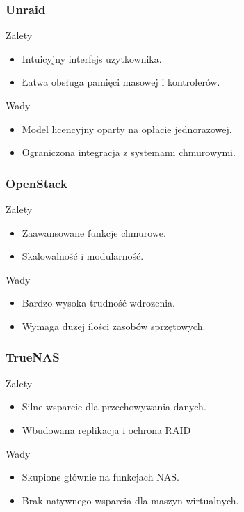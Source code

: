 \subsubsection{Unraid \cite{Unraid}}
\begin{minipage}{0.45\textwidth}
    Zalety
    \begin{itemize}
        \item Intuicyjny interfejs uzytkownika.
        \item Łatwa obsługa pamięci masowej i kontrolerów.
    \end{itemize}
\end{minipage}\hfil
\begin{minipage}{0.45\textwidth}
    Wady
    \begin{itemize}
        \item Model licencyjny oparty na opłacie jednorazowej.
        \item Ograniczona integracja z systemami chmurowymi.
    \end{itemize}
\end{minipage}

\subsubsection{OpenStack \cite{OpenStack}}
\begin{minipage}{0.45\textwidth}
    Zalety
    \begin{itemize}
        \item Zaawansowane funkcje chmurowe.
        \item Skalowalność i modularność.
    \end{itemize}
\end{minipage}\hfil
\begin{minipage}{0.45\textwidth}
    Wady
    \begin{itemize}
        \item Bardzo wysoka trudność wdrozenia.
        \item Wymaga duzej ilości zasobów sprzętowych.
    \end{itemize}
\end{minipage}

\subsubsection{TrueNAS \cite{TrueNAS}}
\begin{minipage}{0.45\textwidth}
    Zalety
    \begin{itemize}
        \item Silne wsparcie dla przechowywania danych.
        \item Wbudowana replikacja i ochrona RAID
    \end{itemize}
\end{minipage}\hfil
\begin{minipage}{0.45\textwidth}
    Wady
    \begin{itemize}
        \item Skupione głównie na funkcjach NAS.
        \item Brak natywnego wsparcia dla maszyn wirtualnych.
    \end{itemize}
\end{minipage}



